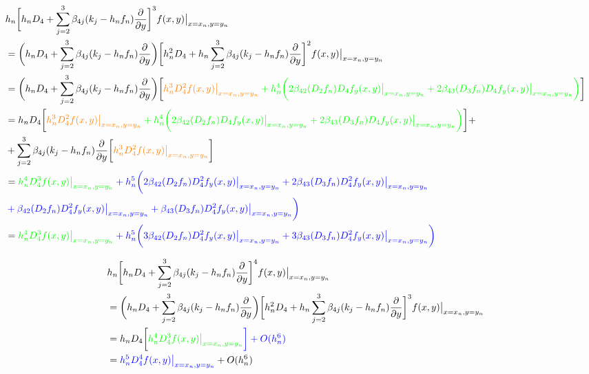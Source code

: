 \documentclass[12 pt]{article}
\begin{document}
	
	\newpage
	\begin{align*}
		&h_{n}\bigg[h_{n}D_{4} + \sum_{j=2}^{3}\beta_{4j}(k_{j} - h_{n}f_{n})\frac{\partial}{\partial y}\bigg]^{3}f(x,y)\big\vert_{x = x_{n}, y= y_{n}}\\
		&= \bigg(h_{n}D_{4} + \sum_{j=2}^{3}\beta_{4j}(k_{j} - h_{n}f_{n})\frac{\partial}{\partial y}\bigg)\bigg[h_{n}^{2}D_{4} + h_{n}\sum_{j=2}^{3}\beta_{4j}(k_{j} - h_{n}f_{n})\frac{\partial}{\partial y}\bigg]^{2}f(x,y)\big\vert_{x = x_{n}, y= y_{n}}\\
		&= \bigg(h_{n}D_{4} + \sum_{j=2}^{3}\beta_{4j}(k_{j} - h_{n}f_{n})\frac{\partial}{\partial y}\bigg)\bigg[\color{orange}h_{n}^{3}D_{4}^{2}f(x,y)\big\vert_{x = x_{n}, y= y_{n}} \color{green} + h_{n}^{4}\bigg(2\beta_{42}(D_{2}f_{n})D_{4}f_{y}(x,y)\big\vert_{x = x_{n}, y= y_{n}} + 2\beta_{43}(D_{3}f_{n})D_{4}f_{y}(x,y)\big\vert_{x = x_{n}, y= y_{n}}\bigg)\color{black}\bigg]\\
		&= h_{n}D_{4}\bigg[\color{orange}h_{n}^{3}D_{4}^{2}f(x,y)\big\vert_{x = x_{n}, y= y_{n}} \color{green} + h_{n}^{4}\bigg(2\beta_{42}(D_{2}f_{n})D_{4}f_{y}(x,y)\big\vert_{x = x_{n}, y= y_{n}} + 2\beta_{43}(D_{3}f_{n})D_{4}f_{y}(x,y)\big\vert_{x = x_{n}, y= y_{n}}\bigg)\color{black}\bigg] + \\
		&+ \sum_{j=2}^{3}\beta_{4j}(k_{j} - h_{n}f_{n})\frac{\partial}{\partial y}\bigg[\color{orange}h_{n}^{3}D_{4}^{2}f(x,y)\big\vert_{x = x_{n}, y= y_{n}}\color{black}\bigg]\\
		&= \color{green}h_{n}^{4}D_{4}^{3}f(x,y)\big\vert_{x = x_{n}, y= y_{n}} \color{blue}+ h_{n}^{5}\bigg(2\beta_{42}(D_{2}f_{n})D_{4}^{2}f_{y}(x,y)\big\vert_{x = x_{n}, y= y_{n}} + 2\beta_{43}(D_{3}f_{n})D_{4}^{2}f_{y}(x,y)\big\vert_{x = x_{n}, y= y_{n}}\\
		&\color{blue}+\beta_{42}(D_{2}f_{n})D_{4}^{2}f_{y}(x,y)\big\vert_{x = x_{n}, y= y_{n}} + \beta_{43}(D_{3}f_{n})D_{4}^{2}f_{y}(x,y)\big\vert_{x = x_{n}, y= y_{n}}\bigg)\\
		&= \color{green}h_{n}^{4}D_{4}^{3}f(x,y)\big\vert_{x = x_{n}, y= y_{n}} \color{blue}+h_{n}^{5}\bigg(3\beta_{42}(D_{2}f_{n})D_{4}^{2}f_{y}(x,y)\big\vert_{x = x_{n}, y= y_{n}} + 3\beta_{43}(D_{3}f_{n})D_{4}^{2}f_{y}(x,y)\big\vert_{x = x_{n}, y= y_{n}}\bigg)
	\end{align*}
	
	\begin{align*}
		&h_{n}\bigg[h_{n}D_{4} + \sum_{j=2}^{3}\beta_{4j}(k_{j} - h_{n}f_{n})\frac{\partial}{\partial y}\bigg]^{4}f(x,y)\big\vert_{x = x_{n}, y= y_{n}}\\
		&=  \bigg(h_{n}D_{4} + \sum_{j=2}^{3}\beta_{4j}(k_{j} - h_{n}f_{n})\frac{\partial}{\partial y}\bigg)\bigg[h_{n}^{2}D_{4} + h_{n}\sum_{j=2}^{3}\beta_{4j}(k_{j} - h_{n}f_{n})\frac{\partial}{\partial y}\bigg]^{3}f(x,y)\big\vert_{x = x_{n}, y= y_{n}}\\
		&= h_{n}D_{4}\bigg[\color{green}h_{n}^{4}D_{4}^{3}f(x,y)\big\vert_{x = x_{n}, y= y_{n}} \color{blue}\bigg] + O(h_{n}^{6})\\
		&= \color{blue}h_{n}^{5}D_{4}^{4}f(x,y)\big\vert_{x = x_{n}, y= y_{n}} \color{black}+ O(h_{n}^{6})
	\end{align*}
	
\end{document}
